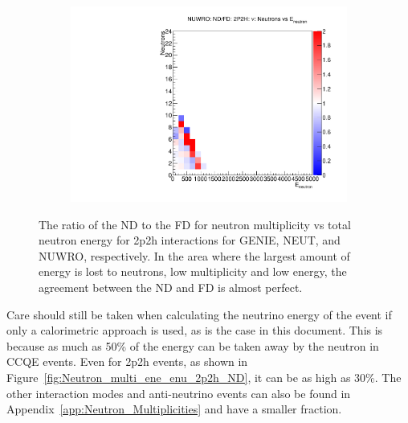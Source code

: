 \documentclass[12pt]{article}
\begin{document}
\begin{figure}
\begin{subfigure}[b]{0.32\textwidth}
  \includegraphics[width=\textwidth]{nneutrons_v_total_ene/Nneutrons_Total_ENe_2p2h_NUWRO_ND_FD_numu_norm.pdf}
\end{subfigure}
\caption{The ratio of the ND to the FD for neutron multiplicity vs total neutron energy for 2p2h interactions for GENIE, NEUT, and NUWRO, respectively.  In the area where the largest amount of energy is lost to neutrons, low multiplicity and low energy, the agreement between the ND and FD is almost perfect.} 
\label{fig:Neutron_multi_2p2h_ND_FD}
\end{figure}

Care should still be taken when calculating the neutrino energy of the event if only a calorimetric approach is used, as is the case in this document.
This is because as much as 50\% of the energy can be taken away by the neutron in CCQE events.
Even for 2p2h events, as shown in Figure~\ref{fig:Neutron_multi_ene_enu_2p2h_ND}, it can be as high as 30\%.
The other interaction modes and anti-neutrino events can also be found in Appendix~\ref{app:Neutron_Multiplicities} and have a smaller fraction.
\end{document}
